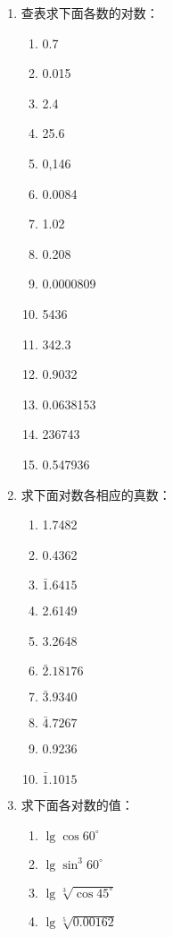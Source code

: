\begin{ex}
\begin{enumerate}
    \item 查表求下面各数的对数：
\begin{multicols}{4}
\begin{enumerate}
    \item 0.7
    \item 0.015
    \item 2.4
    \item 25.6
    \item 0,146
    \item 0.0084
    \item 1.02
    \item 0.208
    \item 0.0000809
    \item 5436
    \item 342.3
    \item 0.9032
    \item 0.0638153
    \item 236743
    \item 0.547936
\end{enumerate}
\end{multicols}
    \item 求下面对数各相应的真数：
    \begin{multicols}{4}
        \begin{enumerate}
            \item 1.7482
            \item 0.4362
            \item $\bar{1}.6415$
            \item 2.6149
            \item 3.2648
            \item $\bar{2}.18176$
            \item $\bar{3}.9340$
            \item $\bar{4}.7267$
            \item 0.9236
            \item $\bar{1}.1015$
        \end{enumerate}
        \end{multicols}   
    \item 求下面各对数的值：
     \begin{multicols}{2}
        \begin{enumerate}
            \item $\lg\cos60^{\circ}$
            \item $\lg\sin^3 60^{\circ}$
            \item $\lg\sqrt[3]{\cos 45^{\circ}}$
            \item $\lg\sqrt[5]{0.00162}$
        \end{enumerate}
        \end{multicols}    
\end{enumerate}
\end{ex}

